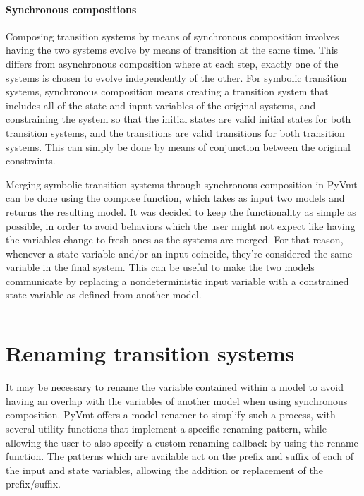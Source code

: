 \paragraph*{Synchronous compositions}
Composing transition systems by means of synchronous composition involves having the two systems evolve by means of transition at the same time.
This differs from asynchronous composition where at each step, exactly one of the systems is chosen to evolve independently of the other.
For symbolic transition systems, synchronous composition means creating a transition system that includes all of the state and input variables of the original systems, and constraining the system so that the initial states are valid initial states for both transition systems, and the transitions are valid transitions for both transition systems.
This can simply be done by means of conjunction between the original constraints.

Merging symbolic transition systems through synchronous composition in PyVmt can be done using the compose function, which takes as input two models and returns the resulting model.
It was decided to keep the functionality as simple as possible, in order to avoid behaviors which the user might not expect like having the variables change to fresh ones as the systems are merged.
For that reason, whenever a state variable and/or an input coincide, they're considered the same variable in the final system.
This can be useful to make the two models communicate by replacing a nondeterministic input variable with a constrained state variable as defined from another model.

\inputminted[firstline=9, lastline=33]{python3}{py/composition.py}

\section{Renaming transition systems}
It may be necessary to rename the variable contained within a model to avoid having an overlap with the variables of another model when using synchronous composition.
PyVmt offers a model renamer to simplify such a process, with several utility functions that implement a specific renaming pattern, while allowing the user to also specify a custom renaming callback by using the rename function.
The patterns which are available act on the prefix and suffix of each of the input and state variables, allowing the addition or replacement of the prefix/suffix.

\inputminted[firstline=9, lastline=41]{python3}{py/renaming.py}

